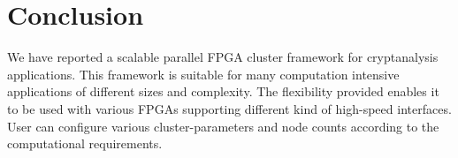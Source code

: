 \documentclass[10pt, conference, compsocconf]{IEEEtran}
\begin{document}
\section{Conclusion}
We have reported a scalable parallel FPGA cluster framework for cryptanalysis applications. This framework is suitable for many computation intensive applications of different sizes and complexity. The flexibility provided enables it to be used with various FPGAs supporting different kind of high-speed interfaces. User can configure various cluster-parameters and node counts according to the computational requirements.





\end{document}
